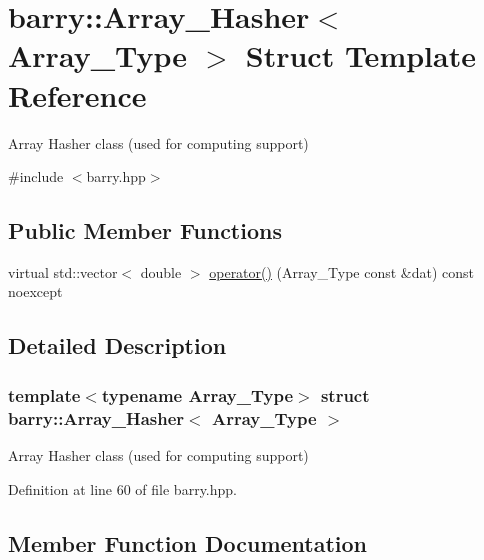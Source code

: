 \hypertarget{structbarry_1_1_array___hasher}{}\section{barry\+:\+:Array\+\_\+\+Hasher$<$ Array\+\_\+\+Type $>$ Struct Template Reference}
\label{structbarry_1_1_array___hasher}


Array Hasher class (used for computing support)  




{\ttfamily \#include $<$barry.\+hpp$>$}

\subsection*{Public Member Functions}
\begin{DoxyCompactItemize}
\item 
virtual std\+::vector$<$ double $>$ \hyperlink{structbarry_1_1_array___hasher_aecc53fb04a3bc5cdcf9208c8a09a30cf}{operator()} (Array\+\_\+\+Type const \&dat) const noexcept
\end{DoxyCompactItemize}


\subsection{Detailed Description}
\subsubsection*{template$<$typename Array\+\_\+\+Type$>$\newline
struct barry\+::\+Array\+\_\+\+Hasher$<$ Array\+\_\+\+Type $>$}

Array Hasher class (used for computing support) 



Definition at line 60 of file barry.\+hpp.



\subsection{Member Function Documentation}
\mbox{\label{structbarry_1_1_array___hasher_aecc53fb04a3bc5cdcf9208c8a09a30cf}} 
